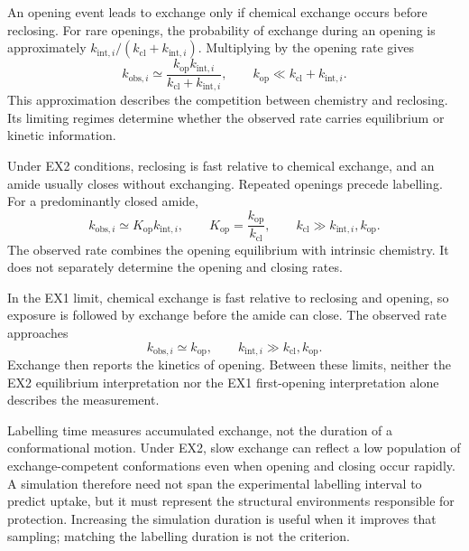 An opening event leads to exchange only if chemical exchange occurs before reclosing. For rare openings, the probability of exchange during an opening is approximately $k_{\text{int},i}/(k_{\text{cl}}+k_{\text{int},i})$. Multiplying by the opening rate gives
\begin{equation}
    k_{\text{obs},i}\simeq
    \frac{k_{\text{op}}k_{\text{int},i}}
    {k_{\text{cl}}+k_{\text{int},i}},
    \qquad k_{\text{op}}\ll k_{\text{cl}}+k_{\text{int},i}.
    \label{eq:bg-effective-rate}
\end{equation}
This approximation describes the competition between chemistry and reclosing. Its limiting regimes determine whether the observed rate carries equilibrium or kinetic information.\supercite{skinnerProteinHydrogenExchange2012}

Under EX2 conditions, reclosing is fast relative to chemical exchange, and an amide usually closes without exchanging. Repeated openings precede labelling. For a predominantly closed amide,
\begin{equation}
    k_{\text{obs},i}\simeq K_{\text{op}}k_{\text{int},i},
    \qquad K_{\text{op}}=\frac{k_{\text{op}}}{k_{\text{cl}}},
    \qquad k_{\text{cl}}\gg k_{\text{int},i},k_{\text{op}}.
    \label{eq:bg-ex2}
\end{equation}
The observed rate combines the opening equilibrium with intrinsic chemistry. It does not separately determine the opening and closing rates.\supercite{skinnerProteinHydrogenExchange2012,englanderHydrogenExchangeModern1997}

In the EX1 limit, chemical exchange is fast relative to reclosing and opening, so exposure is followed by exchange before the amide can close. The observed rate approaches
\begin{equation}
    k_{\text{obs},i}\simeq k_{\text{op}},
    \qquad k_{\text{int},i}\gg k_{\text{cl}},k_{\text{op}}.
    \label{eq:bg-ex1}
\end{equation}
Exchange then reports the kinetics of opening. Between these limits, neither the EX2 equilibrium interpretation nor the EX1 first-opening interpretation alone describes the measurement.\supercite{skinnerProteinHydrogenExchange2012}

Labelling time measures accumulated exchange, not the duration of a conformational motion. Under EX2, slow exchange can reflect a low population of exchange-competent conformations even when opening and closing occur rapidly.\supercite{englanderHydrogenExchangeModern1997,skinnerProteinHydrogenExchange2012} A simulation therefore need not span the experimental labelling interval to predict uptake, but it must represent the structural environments responsible for protection. Increasing the simulation duration is useful when it improves that sampling; matching the labelling duration is not the criterion.

